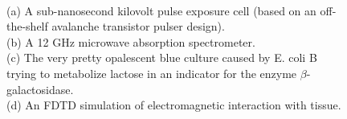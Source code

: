 \documentclass[fleqn,11pt]{article}
\begin{document}
\begin{figure}[H]
	\centering
	
	
	\hfill
	
	\caption*{\\ (a) A sub-nanosecond kilovolt pulse exposure cell (based on an off-the-shelf avalanche transistor pulser design). \\ (b) A 12 GHz microwave absorption spectrometer. \\(c) The very pretty opalescent blue culture caused by E. coli B trying to metabolize lactose in an indicator for the enzyme $\beta$-galactosidase.\\ (d) An FDTD simulation of electromagnetic interaction with tissue. }
\end{figure}
\end{document}
